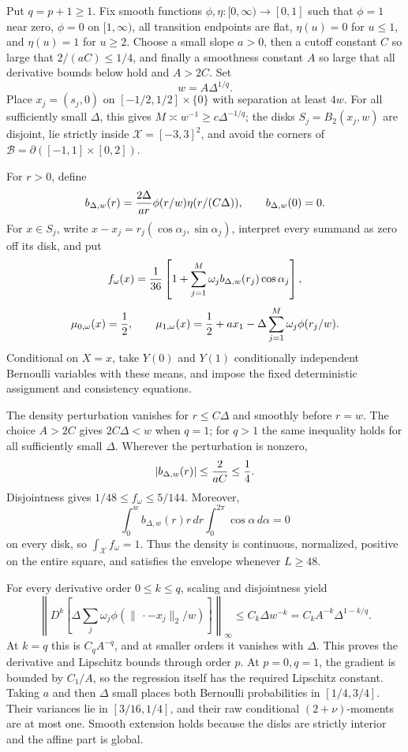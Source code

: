 Put \(q=p+1\geq1\).  Fix smooth functions \(\phi,\eta:[0,\infty)\to[0,1]\) such that \(\phi=1\) near zero, \(\phi=0\) on \([1,\infty)\), all transition endpoints are flat, \(\eta(u)=0\) for \(u\leq1\), and \(\eta(u)=1\) for \(u\geq2\).  Choose a small slope \(a>0\), then a cutoff constant \(C\) so large that \(2/(aC)\leq1/4\), and finally a smoothness constant \(A\) so large that all derivative bounds below hold and \(A>2C\).  Set
\[
 w=A\Delta^{1/q}.
\]
Place \(x_j=(s_j,0)\) on \([-1/2,1/2]\times\{0\}\) with separation at least \(4w\).  For all sufficiently small \(\Delta\), this gives \(M\asymp w^{-1}\geq c\Delta^{-1/q}\); the disks \(S_j=B_2(x_j,w)\) are disjoint, lie strictly inside \(\mathcal X=[-3,3]^2\), and avoid the corners of \(\mathcal B=\partial([-1,1]\times[0,2])\).

For \(r>0\), define
\[
 b_{\Delta,w}(r)={2\Delta\over ar}\phi(r/w)\eta(r/(C\Delta)),
 \qquad b_{\Delta,w}(0)=0.
\]
For \(x\in S_j\), write \(x-x_j=r_j(\cos\alpha_j,\sin\alpha_j)\), interpret every summand as zero off its disk, and put
\[
 f_\omega(x)={1\over36}\left[1+\sum_{j=1}^M\omega_jb_{\Delta,w}(r_j)\cos\alpha_j\right],
\]
\[
 \mu_{0,\omega}(x)={1\over2},
 \qquad
 \mu_{1,\omega}(x)={1\over2}+ax_1-\Delta\sum_{j=1}^M\omega_j\phi(r_j/w).
\]
Conditional on \(X=x\), take \(Y(0)\) and \(Y(1)\) conditionally independent Bernoulli variables with these means, and impose the fixed deterministic assignment and consistency equations.

The density perturbation vanishes for \(r\leq C\Delta\) and smoothly before \(r=w\).  The choice \(A>2C\) gives \(2C\Delta<w\) when \(q=1\); for \(q>1\) the same inequality holds for all sufficiently small \(\Delta\).  Wherever the perturbation is nonzero,
\[
 |b_{\Delta,w}(r)|\leq {2\over aC}\leq{1\over4}.
\]
Disjointness gives \(1/48\leq f_\omega\leq5/144\).  Moreover,
\[
 \int_0^w b_{\Delta,w}(r)r\,dr\int_0^{2\pi}\cos\alpha\,d\alpha=0
\]
on every disk, so \(\int_{\mathcal X}f_\omega=1\).  Thus the density is continuous, normalized, positive on the entire square, and satisfies the envelope whenever \(L\geq48\).

For every derivative order \(0\leq k\leq q\), scaling and disjointness yield
\[
 \left\|D^k\left[\Delta\sum_j\omega_j
 \phi(\|\,\cdot-x_j\|_2/w)\right]\right\|_\infty
 \leq C_k\Delta w^{-k}
 =C_kA^{-k}\Delta^{1-k/q}.
\]
At \(k=q\) this is \(C_qA^{-q}\), and at smaller orders it vanishes with \(\Delta\).  This proves the derivative and Lipschitz bounds through order \(p\).  At \(p=0,q=1\), the gradient is bounded by \(C_1/A\), so the regression itself has the required Lipschitz constant.  Taking \(a\) and then \(\Delta\) small places both Bernoulli probabilities in \([1/4,3/4]\).  Their variances lie in \([3/16,1/4]\), and their raw conditional \((2+\nu)\)-moments are at most one.  Smooth extension holds because the disks are strictly interior and the affine part is global.

